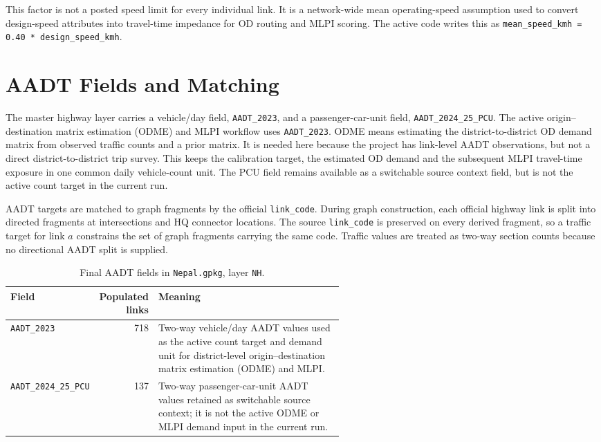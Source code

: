 \documentclass[11pt,a4paper]{article}
\begin{document}
This factor is not a posted speed limit for every individual link. It is a
network-wide mean operating-speed assumption used to convert design-speed
attributes into travel-time impedance for OD routing and MLPI scoring. The
active code writes this as
\texttt{mean\_speed\_kmh = 0.40 * design\_speed\_kmh}.

\section{AADT Fields and Matching}

The master highway layer carries a vehicle/day field, \texttt{AADT\_2023},
and a passenger-car-unit field, \texttt{AADT\_2024\_25\_PCU}. The active
origin--destination matrix estimation (ODME) and MLPI workflow uses
\texttt{AADT\_2023}. ODME means estimating the district-to-district OD demand
matrix from observed traffic counts and a prior matrix. It is needed here
because the project has link-level AADT observations, but not a direct
district-to-district trip survey. This keeps the calibration target, the
estimated OD demand and the subsequent MLPI travel-time exposure in one common
daily vehicle-count unit. The PCU field remains available as a switchable source
context field, but is not the active count target in the current run.

AADT targets are matched to graph fragments by the official
\texttt{link\_code}. During graph construction, each official highway link is
split into directed fragments at intersections and HQ connector locations. The
source \texttt{link\_code} is preserved on every derived fragment, so a traffic
target for link $a$ constrains the set of graph fragments carrying the same
code. Traffic values are treated as two-way section counts because no
directional AADT split is supplied.

\begin{table}[H]
\centering
\caption{Final AADT fields in \texttt{Nepal.gpkg}, layer \texttt{NH}.}
\begin{tabular}{lrp{0.56\linewidth}}
\toprule
\textbf{Field} & \textbf{Populated links} & \textbf{Meaning} \\
\midrule
\texttt{AADT\_2023} & 718 & Two-way vehicle/day AADT values used as the
active count target and demand unit for district-level origin--destination
matrix estimation (ODME) and MLPI. \\
\texttt{AADT\_2024\_25\_PCU} & 137 & Two-way passenger-car-unit AADT values
retained as switchable source context; it is not the active ODME or MLPI demand
input in the current run. \\
\bottomrule
\end{tabular}
\end{table}
\end{document}
